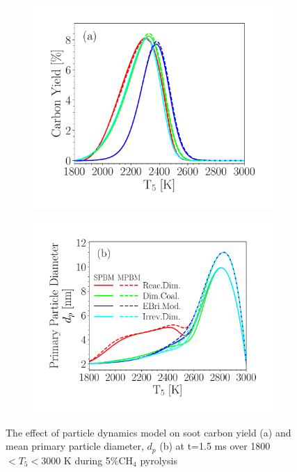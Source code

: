 \begin{figure}[H]
	\centering
	\begin{subfigure}[t]{0.4\textwidth}
		\includegraphics[width=1\textwidth]{Figures/Results/Shocktube/Agafonov2016/carbon_yield_pdynamiceffect.pdf}
	\end{subfigure}
	\begin{subfigure}[t]{0.435\textwidth}
		\includegraphics[width=1\textwidth]{Figures/Results/Shocktube/Agafonov2016/d_p_pdynamiceffect.pdf}
	\end{subfigure}
	\caption{The effect of particle dynamics model on soot carbon yield (a) and mean primary particle diameter, $d_p$ (b) at t=1.5 ms over 1800$<T_5<$3000 K during 5\%$\mathrm{CH_4}$ pyrolysis~\citep{agafonov2016unified}}
	\label{fig:shockagof_pdynamiceffect} 
\end{figure}